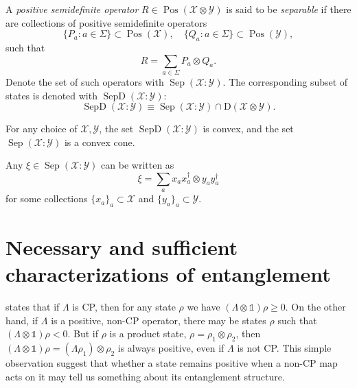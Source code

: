 \documentclass[12pt]{report}
\newcommand{\on}[1]{\operatorname{#1}}
\newcommand{\calY}{{\mathcal{Y}}}
\newcommand{\calX}{{\mathcal{X}}}
\newcommand{\rmD}{{\mathrm{D}}}
\DeclareMathOperator{\Pos}{Pos}
\begin{document}
\begin{defn}
	A \emph{positive semidefinite operator} $R\in\Pos(\calX\otimes\calY)$ is said to be \emph{separable} if there are collections of positive semidefinite operators
	\begin{equation}
		\{P_a : a \in\Sigma\} \subset\Pos(\calX),
		\quad
		\{Q_a : a \in\Sigma\} \subset\Pos(\calY),
	\end{equation}
	such that
	\begin{equation}
		R = \sum_{a\in\Sigma} P_a \otimes Q_a.
	\end{equation}
	Denote the set of such operators with $\on{Sep}(\calX:\calY)$.
	The corresponding subset of states is denoted with $\on{SepD}(\calX:\calY)$:
	\begin{equation}
		\on{SepD}(\calX:\calY) \equiv \on{Sep}(\calX:\calY)\cap \rmD(\calX\otimes\calY).
	\end{equation}
\end{defn}

\begin{prop}
	For any choice of $\calX,\calY$, the set
	$\on{SepD}(\calX:\calY)$ is convex, and the set
	$\on{Sep}(\calX:\calY)$ is a convex cone.
\end{prop}

\begin{prop}
	Any $\xi\in\on{Sep}(\calX:\calY)$ can be written as
	\begin{equation}
		\xi = \sum_a x_a x_a^\dagger\otimes y_a y_a^\dagger
	\end{equation}
	for some collections $\{x_a\}_a\subset\calX$ and $\{y_a\}_a\subset\calY$.
\end{prop}


\section{Necessary and sufficient characterizations of entanglement}
 states that if $\Lambda$ is \ac{CP},
then for any state $\rho$ we have $(\Lambda \otimes \mathds1)\rho \ge 0$.
On the other hand, if $\Lambda$ is a positive, non-\ac{CP} operator, there may be states $\rho$ such that
$(\Lambda \otimes \mathds1)\rho < 0$.
But if $\rho$ is a product state, $\rho = \rho_1 \otimes \rho_2$, then
$(\Lambda \otimes \mathds1)\rho = (\Lambda \rho_1) \otimes \rho_2$ is always positive,
even if $\Lambda$ is not \ac{CP}.
This simple observation suggest that whether a state remains positive when a non-\ac{CP} map acts on it may tell us something about its entanglement structure.
\end{document}
